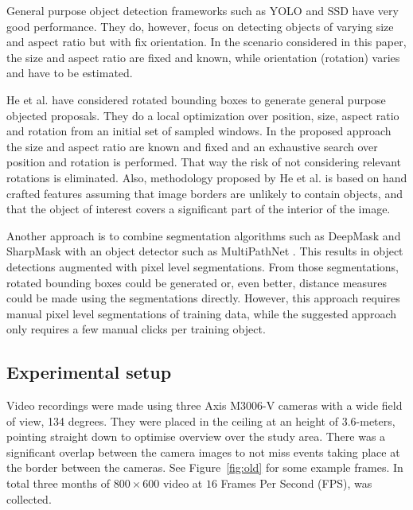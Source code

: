\documentclass{cta-author}
\begin{document}
General purpose object detection frameworks such as YOLO 
\cite{DBLP:journals/corr/RedmonDGF15,redmon2016yolo9000} and SSD \cite{liu2016ssd} have very good 
performance. They do, however, focus on detecting objects of varying size and aspect ratio but with fix 
orientation. In the scenario considered in this paper, the size and aspect ratio are fixed and known, while 
orientation (rotation) varies and have to be estimated. 

He et al. \cite{He_2015_ICCV} have considered rotated bounding boxes to generate general purpose objected 
proposals. They do a local optimization over position, size, aspect ratio and rotation from an initial set of 
sampled windows. In the proposed approach the size and aspect ratio are known and fixed and an exhaustive 
search over position and rotation is performed. That way the risk of not considering relevant rotations is 
eliminated. Also, methodology proposed by He et al. \cite{He_2015_ICCV}  is based on hand crafted features 
assuming that image borders are unlikely to contain objects, and that the object of interest covers a 
significant part of the interior of the image.

Another approach is to combine segmentation algorithms such as
DeepMask \cite{DBLP:journals/corr/PinheiroCD15} and
SharpMask \cite{DBLP:journals/corr/PinheiroLCD16} with an object detector such as 
MultiPathNet \cite{DBLP:journals/corr/ZagoruykoLLPGCD16}. This results in object detections augmented with 
pixel level segmentations. From those segmentations, rotated bounding boxes could be generated or, even 
better, distance measures could be made using the segmentations directly. However, this approach requires 
manual pixel level segmentations of training data, while the suggested approach only requires a few manual 
clicks per training object.

\subsection{Experimental setup}


Video recordings were made using three Axis M3006-V cameras with a wide field of view, 134 degrees. They were 
placed in the ceiling at an height of $3.6$-meters, pointing straight down to optimise overview over the 
study area. There was a significant overlap between the camera images to not miss events taking place at the 
border between the cameras. See Figure~\ref{fig:old} for some example frames. In total three months of $800 
\times 600$ video at $16$ Frames Per Second (FPS), was collected.
\end{document}
